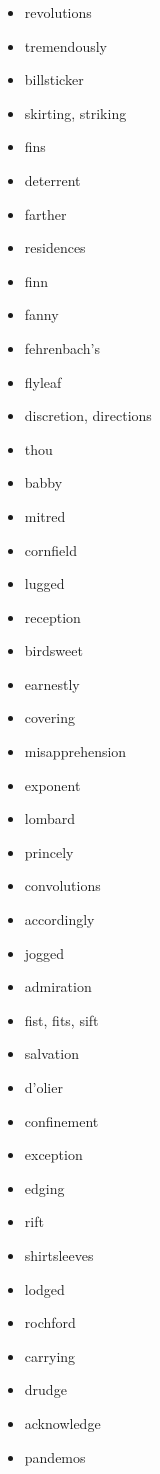 \documentclass{article}
\begin{document}
\begin{itemize}
    \item revolutions
    \item tremendously
    \item billsticker
    \item skirting, striking
    \item fins
    \item deterrent
    \item farther
    \item residences
    \item finn
    \item fanny
    \item fehrenbach's
    \item flyleaf
    \item discretion, directions
    \item thou
    \item babby
    \item mitred
    \item cornfield
    \item lugged
    \item reception
    \item birdsweet
    \item earnestly
    \item covering
    \item misapprehension
    \item exponent
    \item lombard
    \item princely
    \item convolutions
    \item accordingly
    \item jogged
    \item admiration
    \item fist, fits, sift
    \item salvation
    \item d'olier
    \item confinement
    \item exception
    \item edging
    \item rift
    \item shirtsleeves
    \item lodged
    \item rochford
    \item carrying
    \item drudge
    \item acknowledge
    \item pandemos

\end{itemize}
\end{document}
